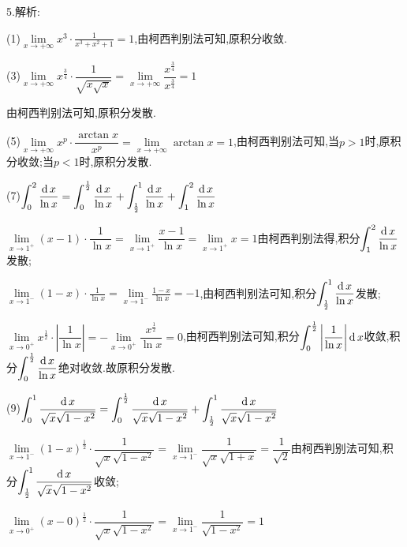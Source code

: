 5.解析:

(1)$\lim\limits_{x \to +\infty} {x^3} \cdot \frac{1}{{{x^3} + {x^2} + 1}} = 1$,由柯西判别法可知,原积分收敛.

(3)$\lim\limits_{x \to +\infty} {x^{\frac{3}{4}}} \cdot \dfrac{1}{{\sqrt {x\sqrt x } }} = \lim\limits_{x \to +\infty} \dfrac{{{x^{\frac{3}{4}}}}}{{{x^{\frac{3}{4}}}}} = 1$

由柯西判别法可知,原积分发散.

(5)$\lim\limits_{x \to +\infty} {x^p} \cdot \dfrac{{\arctan x}}{{{x^p}}} = \lim\limits_{x \to +\infty} \arctan x = 1$,由柯西判别法可知,当$p > 1$时,原积分收敛;当$p < 1$时,原积分发散.

(7)$\displaystyle\int_0^2 {\dfrac{{\operatorname{\mathop{}\!\mathrm{d}} x}}{{\ln x}}}  = \displaystyle\int_0^{\frac{1}{2}} {\dfrac{{\operatorname{\mathop{}\!\mathrm{d}} x}}{{\ln x}}}  + \displaystyle\int_{\frac{1}{2}}^1 {\dfrac{{\operatorname{\mathop{}\!\mathrm{d}} x}}{{\ln x}}}  + \displaystyle\int_1^2 {\dfrac{{\operatorname{\mathop{}\!\mathrm{d}} x}}{{\ln x}}} $

$\lim\limits_{x \to 1^+} (x - 1) \cdot \dfrac{1}{{\ln x}} = \lim\limits_{x \to 1^+} \dfrac{{x - 1}}{{\ln x}} = \lim\limits_{x \to 1^+} x = 1$由柯西判别法得,积分$\displaystyle\int_1^2 {\dfrac{{\operatorname{\mathop{}\!\mathrm{d}} x}}{{\ln x}}} $发散;

$\lim\limits_{x \to 1^-} (1 - x) \cdot \frac{1}{{\ln x}} = \lim\limits_{x \to 1^-} \frac{{1 - x}}{{\ln x}} =  - 1$,由柯西判别法可知,积分$\displaystyle\int_{\frac{1}{2}}^1 {\dfrac{{\operatorname{\mathop{}\!\mathrm{d}} x}}{{\ln x}}} $发散;

$\lim\limits_{x \to 0^+} {x^{\frac{1}{2}}} \cdot \left| {\dfrac{1}{{\ln x}}} \right| =  - \lim\limits_{x \to 0^+} \dfrac{{{x^{\frac{1}{2}}}}}{{\ln x}} = 0$,由柯西判别法可知,积分$\displaystyle\int_0^{\frac{1}{2}} {\left| {\dfrac{1}{{\ln x}}} \right|\operatorname{\mathop{}\!\mathrm{d}} x} $收敛,积分$\displaystyle\int_0^{\frac{1}{2}} {\dfrac{{\operatorname{\mathop{}\!\mathrm{d}} x}}{{\ln x}}} $绝对收敛.故原积分发散.

(9)$\displaystyle\int_0^1 {\dfrac{{\operatorname{\mathop{}\!\mathrm{d}} x}}{{\sqrt x \sqrt {1 - {x^2}} }}}  = \displaystyle\int_0^{\frac{1}{2}} {\dfrac{{\operatorname{\mathop{}\!\mathrm{d}} x}}{{\sqrt x \sqrt {1 - {x^2}} }}}  + \displaystyle\int_{\frac{1}{2}}^1 {\dfrac{{\operatorname{\mathop{}\!\mathrm{d}} x}}{{\sqrt x \sqrt {1 - {x^2}} }}} $

$\lim\limits_{x \to 1^-} {(1 - x)^{\frac{1}{2}}} \cdot \dfrac{1}{{\sqrt x \sqrt {1 - {x^2}} }} = \lim\limits_{x \to 1^-} \dfrac{1}{{\sqrt x \sqrt {1 + x} }} = \dfrac{1}{{\sqrt 2 }}$由柯西判别法可知,积分$\displaystyle\int_{\frac{1}{2}}^1 {\dfrac{{\operatorname{\mathop{}\!\mathrm{d}} x}}{{\sqrt x \sqrt {1 - {x^2}} }}} $收敛;

$\lim\limits_{x \to 0^+} {(x - 0)^{\frac{1}{2}}} \cdot \dfrac{1}{{\sqrt x \sqrt {1 - {x^2}} }} = \lim\limits_{x \to 1^-} \dfrac{1}{{\sqrt {1 - {x^2}} }} = 1$

